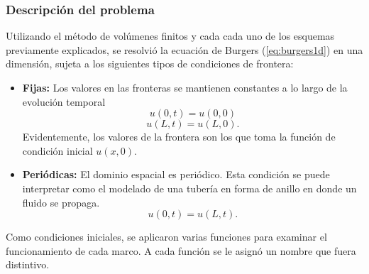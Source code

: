 \documentclass[12pt]{article}
\begin{document}
	\subsubsection{Descripción del problema}
	Utilizando el método de volúmenes finitos y cada cada uno de los esquemas previamente explicados, se resolvió la ecuación de Burgers (\ref{eq:burgers1d}) en una dimensión, sujeta a los siguientes tipos de condiciones de frontera:
	\begin{itemize}
		\item \textbf{Fijas:} Los valores en las fronteras se mantienen constantes a lo largo de la evolución temporal
		\begin{equation}
			u(0,t) = u(0,0)
		\end{equation}
		\begin{equation}
			u(L, t) = u(L, 0).
		\end{equation}
		Evidentemente, los valores de la frontera son los que toma la función de condición inicial $u(x,0)$.
		\item \textbf{Periódicas:} El dominio espacial es periódico. Esta condición se puede interpretar como el modelado de una tubería en forma de anillo en donde un fluido se propaga.
		\begin{equation}
			u(0,t) = u(L, t).
		\end{equation}
	\end{itemize}
	Como condiciones iniciales, se aplicaron varias funciones para examinar el funcionamiento de cada marco. A cada función se le asignó un nombre que fuera distintivo.
\end{document}
